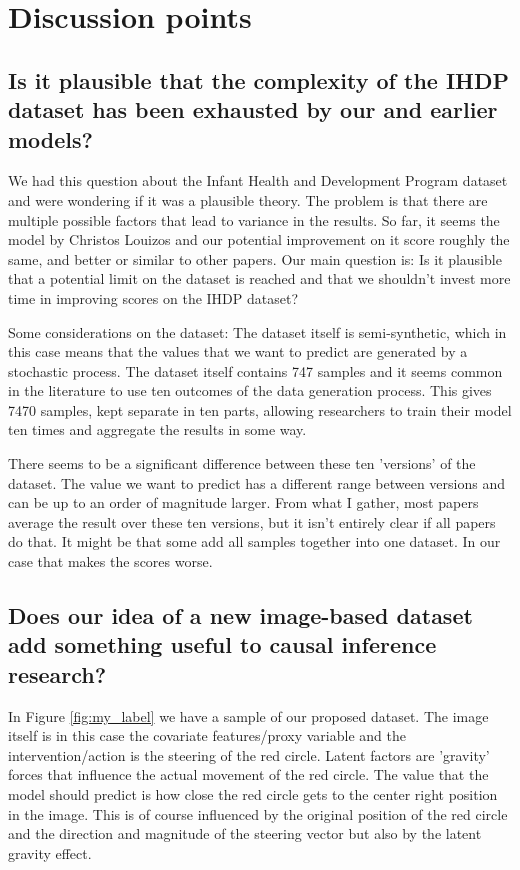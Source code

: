 \documentclass{article}
\begin{document}
\section*{Discussion points}

\subsection*{Is it plausible that the complexity of the IHDP dataset has been exhausted by our and earlier models?}
We had this question about the Infant Health and Development Program dataset and were wondering if it was a plausible theory. The problem is that there are multiple possible factors that lead to variance in the results. So far, it seems the model by Christos Louizos and our potential improvement on it score roughly the same, and better or similar to other papers. Our main question is: Is it plausible that a potential limit on the dataset is reached and that we shouldn't invest more time in improving scores on the IHDP dataset?

Some considerations on the dataset:
The dataset itself is semi-synthetic, which in this case means that the values that we want to predict are generated by a stochastic process. The dataset itself contains 747 samples and it seems common in the literature to use ten outcomes of the data generation process. This gives 7470 samples, kept separate in ten parts, allowing researchers to train their model ten times and aggregate the results in some way. 

There seems to be a significant difference between these ten 'versions' of the dataset. The value we want to predict has a different range between versions and can be up to an order of magnitude larger. From what I gather, most papers average the result over these ten versions, but it isn't entirely clear if all papers do that. It might be that some add all samples together into one dataset. In our case that makes the scores worse.


\subsection*{Does our idea of a new image-based dataset add something useful to causal inference research?}
In Figure \ref{fig:my_label} we have a sample of our proposed dataset. The image itself is in this case the covariate features/proxy variable and the intervention/action is the steering of the red circle. Latent factors are 'gravity' forces that influence the actual movement of the red circle. The value that the model should predict is how close the red circle gets to the center right position in the image. This is of course influenced by the original position of the red circle and the direction and magnitude of the steering vector but also by the latent gravity effect.
\end{document}
